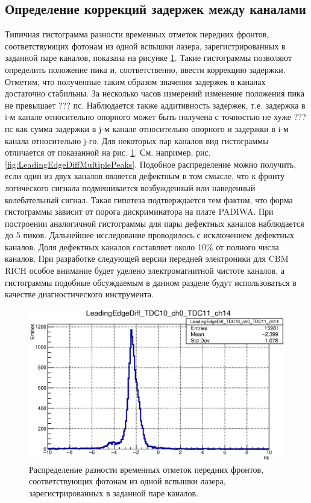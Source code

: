 \subsection{Определение коррекций задержек между каналами}

Типичная гистограмма разности временных отметок передних фронтов, соответствующих фотонам из одной вспышки лазера, зарегистрированных в заданной паре каналов, показана на рисунке \ref{fig:TypicalLeadingEdgeDiff}. Такие гистограммы позволяют определить положение пика и, соответственно, ввести коррекцию задержки. Отметим, что полученные таким образом значения задержек в каналах достаточно стабильны. За несколько часов измерений изменение положения пика не превышает ??? пс. Наблюдается также аддитивность задержек, т.е. задержка в i-м канале относительно опорного может быть получена с точностью не хуже ??? пс как сумма задержки в j-м канале относительно опорного и задержки в i-м канала относительно j-го. Для некоторых пар каналов вид гистограммы отличается от показанной на рис. \ref{fig:TypicalLeadingEdgeDiff}. См. например, рис. \ref{fig:LeadingEdgeDiffMultiplePeaks}. Подобное распределение можно получить, если один из двух каналов является дефектным в том смысле, что к фронту логического сигнала подмешивается возбужденный или наведенный колебательный сигнал. Такая гипотеза подтверждается тем фактом, что форма гистограммы зависит от порога дискриминатора на плате PADIWA. При построении аналогичной гистограммы для пары дефектных каналов наблюдается до 5 пиков. Дальнейшее исследование проводилось с исключением дефектных каналов. Доля дефектных каналов составляет около 10\% от полного числа каналов. При разработке следующей версии передней электроники для CBM RICH особое внимание будет уделено электромагнитной чистоте каналов, а гистограммы подобные обсуждаемым в данном разделе будут использоваться в качестве диагностического инструмента.

\begin{figure}
\includegraphics[width=1.0\textwidth]{pictures/LeadingEdgeDiff_TDC10_ch0_TDC11_ch14.eps}
\caption{Распределение разности временных отметок передних фронтов, соответствующих фотонам из одной вспышки лазера, зарегистрированных в заданной паре каналов.}
\label{fig:TypicalLeadingEdgeDiff}
\end{figure}

